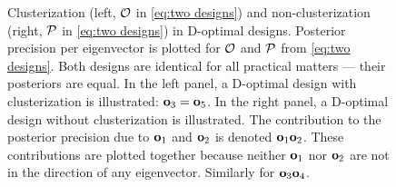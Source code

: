 \begin{figure}
  \caption{Clusterization (left, $\mathcal{O}$ in \eqref{eq:two designs})
    and non-clusterization (right, $\mathcal{P}$ in \eqref{eq:two designs})
    in D-optimal designs. Posterior precision per eigenvector is
    plotted for $\mathcal{O}$ and $\mathcal{P}$ from \eqref{eq:two
      designs}. Both designs are identical for all practical matters
    --- their posteriors are equal. In the left panel, a D-optimal
    design with clusterization is illustrated: $\mathbf{o}_3 = \mathbf{o}_5$. In
    the right panel, a D-optimal design without clusterization is
    illustrated. The contribution to the posterior precision due to
    $\mathbf{o}_1$ and $\mathbf{o}_2$ is denoted $\mathbf{o}_1\mathbf{o}_2$. These
    contributions are plotted together because neither $\mathbf{o}_1$ nor
    $\mathbf{o}_2$ are not in the direction of any eigenvector. Similarly
    for $\mathbf{o}_3\mathbf{o}_4$.}
  \label{fig:clusterization}
\end{figure}
